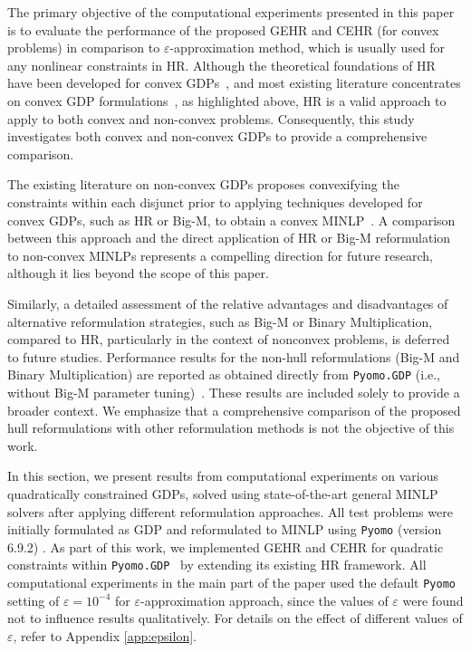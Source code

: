 \documentclass[11pt]{article}
\begin{document}
The primary objective of the computational experiments presented in this paper is to evaluate the performance of the proposed GEHR and CEHR (for convex problems) in comparison to \(\varepsilon\)-approximation method, which is usually used for any nonlinear constraints in HR.
Although the theoretical foundations of HR have been developed for convex GDPs~\cite{ceriaConvexProgrammingDisjunctive1999,grossmannGeneralizedConvexDisjunctive2003}, and most existing literature concentrates on convex GDP formulations~\cite{bernalneiraConvexMixedintegerNonlinear2024, grossmannGeneralizedConvexDisjunctive2003, grossmannGeneralizedDisjunctiveProgramming2012}, as highlighted above, HR is a valid approach to apply to both convex and non-convex problems.
Consequently, this study investigates both convex and non-convex GDPs to provide a comprehensive comparison.


The existing literature on non-convex GDPs proposes convexifying the constraints within each disjunct prior to applying techniques developed for convex GDPs, such as HR or Big-M, to obtain a convex MINLP~\cite{ruizGlobalOptimizationNonconvex2017, trespalaciosCuttingPlanesImproved2016}.
A comparison between this approach and the direct application of HR or Big-M reformulation to non-convex MINLPs represents a compelling direction for future research, although it lies beyond the scope of this paper.

Similarly, a detailed assessment of the relative advantages and disadvantages of alternative reformulation strategies, such as Big-M or Binary Multiplication, compared to HR, particularly in the context of nonconvex problems, is deferred to future studies. Performance results for the non-hull reformulations (Big-M and Binary Multiplication) are reported as obtained directly from \texttt{Pyomo.GDP} (i.e., without Big-M parameter tuning)~\cite{chenPyomoGDPEcosystemLogic2022}. These results are included solely to provide a broader context.
We emphasize that a comprehensive comparison of the proposed hull reformulations with other reformulation methods is not the objective of this work.



In this section, we present results from computational experiments on various quadratically constrained GDPs, solved using state-of-the-art general MINLP solvers after applying different reformulation approaches.
All test problems were initially formulated as GDP and reformulated to MINLP using \texttt{Pyomo} (version 6.9.2) \cite{bynumPyomoOptimizationModeling2021}. 
As part of this work, we implemented GEHR and CEHR for quadratic constraints within \texttt{Pyomo.GDP}~\cite{chenPyomoGDPEcosystemLogic2022} by extending its existing  HR framework. 
All computational experiments in the main part of the paper used the default \texttt{Pyomo} setting of  \(\varepsilon = 10^{-4}\) for  \(\varepsilon\)-approximation approach, since the values of \(\varepsilon \) were found not to influence results qualitatively. For details on the effect of different values of \(\varepsilon\), refer to Appendix \ref{app:epsilon}.
\end{document}
